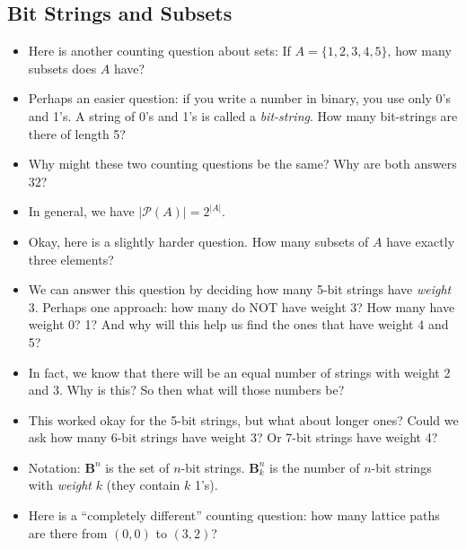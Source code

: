 \documentclass[12pt]{article}
\theoremstyle{plain}
\theoremstyle{definition}
\theoremstyle{remark}
\def\pow{\mathcal{P}}
\def\b{\mathbf}
\newcommand{\todayis}[1]{\clearpage{\rhead{\footnotesize #1}}}
\begin{document}
\begin{itemize}
\end{itemize}

 \todayis{Wednesday, September 6}
 \subsection*{Bit Strings and Subsets}


 \begin{itemize}
   \item Here is another counting question about sets: If $A = \{1,2,3,4,5\}$, how many subsets does $A$ have?

   \item Perhaps an easier question: if you write a number in binary, you use only 0's and 1's.  A string of 0's and 1's is called a \emph{bit-string}.  How many bit-strings are there of length 5?

   \item Why might these two counting questions be the same?  Why are both answers $32$?

   \item In general, we have $|\pow(A)| = 2^{|A|}$.


	\item Okay, here is a slightly harder question.  How many subsets of $A$ have exactly three elements?

	\item We can answer this question by deciding how many 5-bit strings have \emph{weight} 3.  Perhaps one approach: how many do NOT have weight 3?  How many have weight 0?  1?  And why will this help us find the ones that have weight 4 and 5?

	\item In fact, we know that there will be an equal number of strings with weight 2 and 3.  Why is this?  So then what will those numbers be?

	\item This worked okay for the 5-bit strings, but what about longer ones?  Could we ask how many 6-bit strings have weight 3?  Or 7-bit strings have weight 4?

   \item Notation: $\b B^n$ is the set of $n$-bit strings.  $\b B^n_k$ is the number of $n$-bit strings with {\em weight} $k$ (they contain $k$ 1's).

   \item Here is a ``completely different'' counting question: how many lattice paths are there from $(0,0)$ to $(3,2)$?


\end{itemize}
\end{document}
